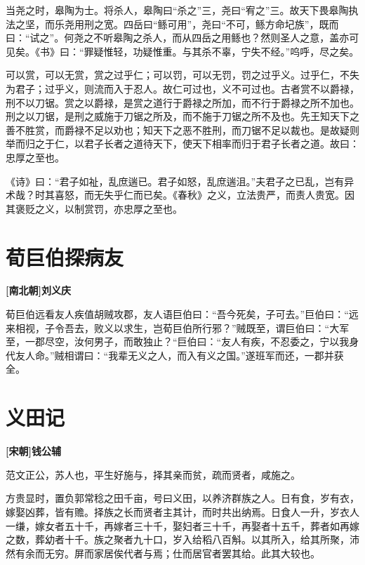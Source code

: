 \documentclass[UTF8,titlepage,oneside]{ctexbook}
\begin{document}
当尧之时，皋陶为士。将杀人，皋陶曰“杀之”三，尧曰“宥之”三。故天下畏皋陶执法之坚，而乐尧用刑之宽。四岳曰“鲧可用”，尧曰“不可，鲧方命圮族”，既而曰：“试之”。何尧之不听皋陶之杀人，而从四岳之用鲧也？然则圣人之意，盖亦可见矣。《书》曰：“罪疑惟轻，功疑惟重。与其杀不辜，宁失不经。”呜呼，尽之矣。


可以赏，可以无赏，赏之过乎仁；可以罚，可以无罚，罚之过乎义。过乎仁，不失为君子；过乎义，则流而入于忍人。故仁可过也，义不可过也。古者赏不以爵禄，刑不以刀锯。赏之以爵禄，是赏之道行于爵禄之所加，而不行于爵禄之所不加也。刑之以刀锯，是刑之威施于刀锯之所及，而不施于刀锯之所不及也。先王知天下之善不胜赏，而爵禄不足以劝也；知天下之恶不胜刑，而刀锯不足以裁也。是故疑则举而归之于仁，以君子长者之道待天下，使天下相率而归于君子长者之道。故曰：忠厚之至也。


《诗》曰：“君子如祉，乱庶遄已。君子如怒，乱庶遄沮。”夫君子之已乱，岂有异术哉？时其喜怒，而无失乎仁而已矣。《春秋》之义，立法贵严，而责人贵宽。因其褒贬之义，以制赏罚，亦忠厚之至也。



\chapter*{荀巨伯探病友}
\begin{center}
	\textbf{[南北朝]刘义庆}
\end{center}

荀巨伯远看友人疾值胡贼攻郡，友人语巨伯曰：“吾今死矣，子可去。”巨伯曰：“远来相视，子令吾去，败义以求生，岂荀巨伯所行邪？”贼既至，谓巨伯曰：“大军至，一郡尽空，汝何男子，而敢独止？“巨伯曰：“友人有疾，不忍委之，宁以我身代友人命。”贼相谓曰：“我辈无义之人，而入有义之国。”遂班军而还，一郡并获全。


\chapter*{义田记}
\begin{center}
	\textbf{[宋朝]钱公辅}
\end{center}

范文正公，苏人也，平生好施与，择其亲而贫，疏而贤者，咸施之。

方贵显时，置负郭常稔之田千亩，号曰义田，以养济群族之人。日有食，岁有衣，嫁娶凶葬，皆有赡。择族之长而贤者主其计，而时共出纳焉。日食人一升，岁衣人一缣，嫁女者五十千，再嫁者三十千，娶妇者三十千，再娶者十五千，葬者如再嫁之数，葬幼者十千。族之聚者九十口，岁入给稻八百斛。以其所入，给其所聚，沛然有余而无穷。屏而家居俟代者与焉；仕而居官者罢其给。此其大较也。
\end{document}
